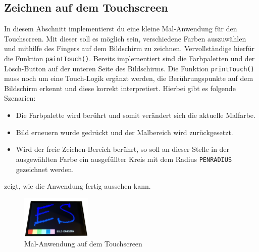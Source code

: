 \subsection{Zeichnen auf dem Touchscreen}
In diesem Abschnitt implementierst du eine kleine Mal-Anwendung für den Touchscreen.
Mit dieser soll es möglich sein, verschiedene Farben auszuwählen und mithilfe des Fingers auf dem Bildschirm zu zeichnen.
Vervollständige hierfür die Funktion \lstinline|paintTouch()|.
Bereits implementiert sind die Farbpaletten und der Lösch-Button auf der unteren Seite des Bildschirms.
Die Funktion \lstinline|printTouch()| muss noch um eine Touch-Logik ergänzt werden, die Berührungspunkte auf dem Bildschirm erkennt und diese korrekt interpretiert.
Hierbei gibt es folgende Szenarien:
\begin{itemize}
\item 
Die Farbpalette wird berührt und somit verändert sich die aktuelle Malfarbe.
\item 
Bild erneuern wurde gedrückt und der Malbereich wird zurückgesetzt.
\item 
Wird der freie Zeichen-Bereich berührt, so soll an dieser Stelle in der ausgewählten Farbe ein ausgefüllter Kreis mit dem Radius \lstinline|PENRADIUS| gezeichnet werden.
\end{itemize}
 zeigt, wie die Anwendung fertig aussehen kann.
\begin{figure}[htbp]
	\centering
	\includegraphics[width=0.3\textwidth]{./05_c/figures/Paint-Szenario.png}
	\caption{Mal-Anwendung auf dem Touchscreen}
	\label{fig:paintTouch}
\end{figure} 